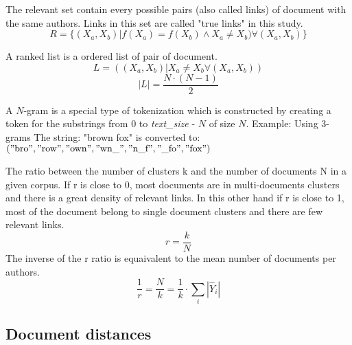 \begin{definition}
  The relevant set contain every possible pairs (also called links) of document with the same authors. Links in this set are called "true links" in this study.
  \begin{equation}
    R = \{(X_a, X_b) | f(X_a) = f(X_b) \land X_a \neq X_b) \forall (X_a, X_b)\}
  \end{equation}
\end{definition}

\begin{definition}
  A ranked list is a ordered list of pair of document.
  \begin{equation}
    L = ((X_a, X_b) | X_a \neq X_b \forall (X_a, X_b))
  \end{equation}
  \begin{equation}
    |L| = \frac{N \cdot (N - 1)}{2}
  \end{equation}
\end{definition}

\begin{definition}[$N$-Grams]
  A $N$-gram is a special type of tokenization which is constructed by creating a token for the substrings from $0$ to \textit{text\_size} - $N$ of size $N$.
  Example: Using 3-grams The string: "brown fox" is converted to: \\
  $("\text{bro}", "\text{row}", "\text{own}", "\text{wn\_}", "\text{n\_f}", "\text{\_fo}", "\text{fox}")$
\end{definition}

\begin{definition}
  The ratio between the number of clusters k and the number of documents N in a given corpus.
  If r is close to 0, most documents are in multi-documents clusters and there is a great density of relevant links.
  In this other hand if r is close to 1, most of the document belong to single document clusters and there are few relevant links.
  \begin{equation}
    r = \frac{k}{N}
  \end{equation}
  The inverse of the r ratio is equaivalent to the mean number of documents per authors.
  \begin{equation}
    \frac{1}{r} = \frac{N}{k} = \frac{1}{k} \cdot \sum_{i} |\hat{Y}_i|
  \end{equation}
\end{definition}

\subsection{Document distances}

